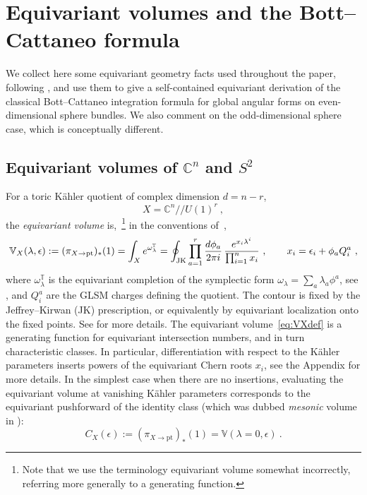\documentclass[11pt,a4paper]{article}
\theoremstyle{definition}
\theoremstyle{identity}
\theoremstyle{remark}
\newcommand{\be}{\begin{equation}}
\newcommand{\ee}{\end{equation}}
\newcommand{\e}{\epsilon}
\newcommand{\lam}{\lambda}
\newcommand{\BV}{\mathbb{V}}
\newcommand{\BT}{\mathbb{T}}
\newcommand{\BC}{\mathbb{C}}
\begin{document}
\section{Equivariant volumes and the Bott--Cattaneo formula}
\label{sec:review}

We collect here some equivariant geometry facts used throughout the paper, following
\cite{Cassia:2025aus,Martelli:2023oqk}, and use them to give a self-contained equivariant
derivation of the classical Bott--Cattaneo integration formula
\cite{1997dg.ga} for global angular forms on even-dimensional sphere bundles. We also comment on the odd-dimensional sphere case, which is conceptually different.

\subsection{Equivariant volumes of $\BC^n$ and $S^2$}

For a toric K\"ahler quotient of complex dimension $d=n-r$,
\be
X=\BC^n/\!\!/U(1)^r\ ,
\ee
 the \emph{equivariant volume} is,~\footnote{Note that we use the terminology equivariant volume somewhat incorrectly, referring more generally to a generating function.} in the conventions of~\cite{Cassia:2025aus},
\be
\label{eq:VXdef}
\BV_X(\lambda,\epsilon)
:= (\pi_{X \to \text{pt}})_* (1) = 
\int_X e^{\omega_\lambda^{\BT}}
=
\oint_{\rm JK}
\prod_{a=1}^r
\frac{d\phi_a}{2\pi i}\,
\frac{e^{x_i\lambda^i}}
{\prod_{i=1}^n x_i}\ ,
\qquad
x_i=\epsilon_i+\phi_aQ_i^a\ ,
\ee
where $\omega_\lambda^\mathbb{T}$ is the equivariant completion of the symplectic form $\omega_\lambda=\sum_a\lambda_a\phi^a$, see \cite{Martelli:2023oqk},  and $Q_i^a$ are the GLSM charges defining the quotient. The contour is fixed by the
Jeffrey--Kirwan (JK) prescription, or equivalently by equivariant localization onto the fixed points. See \cite{Cassia:2025aus} for more details. The equivariant volume~\eqref{eq:VXdef} is a generating function for equivariant intersection
numbers, and in turn characteristic classes. In particular, differentiation with respect to the K\"ahler parameters inserts powers of
the equivariant Chern roots $x_i$, see the Appendix for more details. In the simplest case when there are no insertions, evaluating the equivariant volume at vanishing K\"ahler parameters corresponds to the equivariant pushforward of the identity class (which was dubbed \emph{mesonic} volume in \cite{Cassia:2025aus}):
\be
\label{eq:mesonicvol}
    C_X (\e) := (\pi_{X \to \text{pt}})_* (1) = \BV (\lam = 0, \e)\ .
\ee
\end{document}
